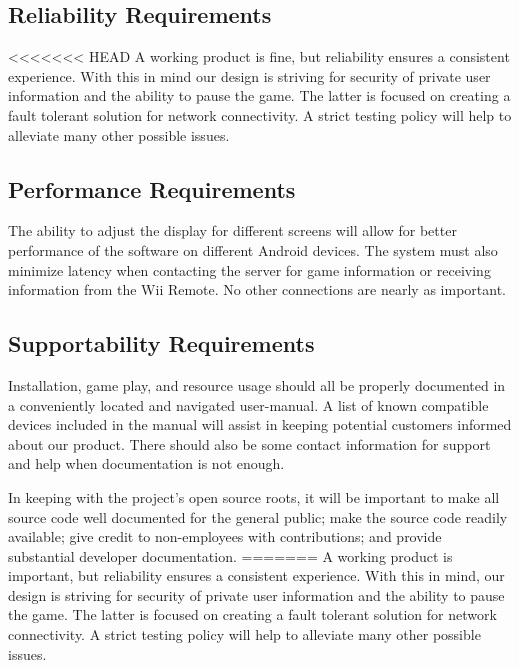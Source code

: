 \documentclass[12pt]{article}
\newenvironment{itemize*}%
  {\begin{itemize}%
  	\setlength{\parsep}{0pt}
    \setlength{\itemsep}{0pt}%
    \setlength{\parskip}{0pt}}%
  {\end{itemize}}
\begin{document}
\begin{itemize*}
\subsection{Reliability Requirements}
<<<<<<< HEAD
A working product is fine, but reliability ensures a consistent experience.  With this in mind our design is striving for security of private user information and the ability to pause the game.  The latter is focused on creating a fault tolerant solution for network connectivity.  A strict testing policy will help to alleviate many other possible issues.

\subsection{Performance Requirements}
The ability to adjust the display for different screens will allow for better performance of the software on different Android devices.  The system must also minimize latency when contacting the server for game information or receiving information from the Wii Remote.  No other connections are nearly as important.

\subsection{Supportability Requirements}
Installation, game play, and resource usage should all be properly documented in a conveniently located and navigated user-manual. A list of known compatible devices included in the manual will assist in keeping potential customers informed about our product.  There should also be some contact information for support and help when documentation is not enough.

In keeping with the project's open source roots, it will be important to make all source code well documented for the general public; make the source code readily available; give credit to non-employees with contributions; and provide substantial developer documentation. 
=======
A working product is important, but reliability ensures a consistent experience.  With this in mind, our design is striving for security of private user information and the ability to pause the game.  The latter is focused on creating a fault tolerant solution for network connectivity.  A strict testing policy will help to alleviate many other possible issues.


\end{itemize*}
\end{document}
